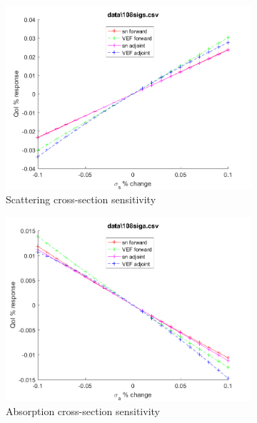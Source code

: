 \documentclass{article}
\begin{document}
\begin{figure}[H]
\begin{subfigure}{.5\textwidth}
  \includegraphics[width=.98\linewidth]{IanProposal/figures2/108sigsSens.png}
  \caption{Scattering cross-section sensitivity}
  \label{fig:sfig2}
\end{subfigure}%
\begin{subfigure}{.5\textwidth}
  \centering
  \includegraphics[width=.98\linewidth]{IanProposal/figures2/108sigaSens.png}
  \caption{Absorption cross-section sensitivity}
  \label{fig:sfig5}
\end{subfigure}%
\caption{}
\label{fig:fig}
\end{figure}
\newpage

\end{document}
